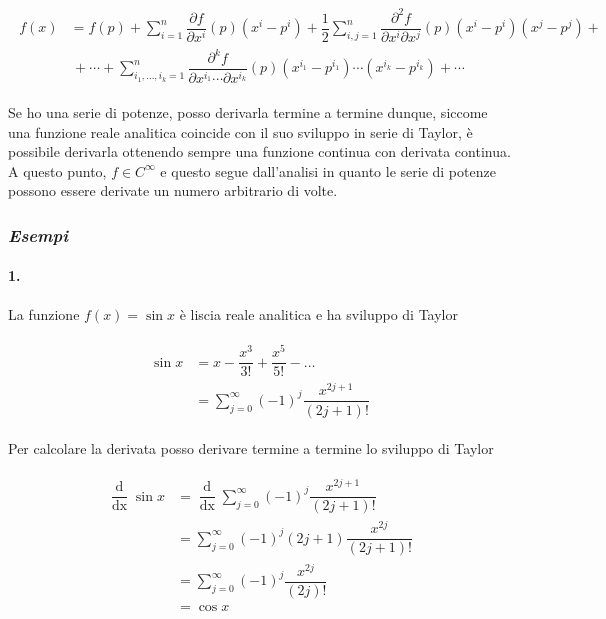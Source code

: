 \begin{align}
	\begin{split}
		f (x) &= f (p) + \sum_{i=1}^{n} \dfrac{\partial f}{\partial x^{i}} (p) (x^{i} - p^{i}) + \dfrac{1}{2} \sum_{i,j=1}^{n} \dfrac{\partial^{2} f}{\partial x^{i} \partial x^{j}} (p) (x^{i} - p^{i}) (x^{j} - p^{j}) +\\
		& \, + \cdots + \sum_{i_{1},\dots,i_{k}=1}^{n} \dfrac{\partial^{k} f}{\partial x^{i_{1}} \cdots \partial x^{i_{k}}} (p) (x^{i_{1}} - p^{i_{1}}) \cdots (x^{i_{k}} - p^{i_{k}}) + \cdots
	\end{split}
\end{align}

Se ho una serie di potenze, posso derivarla termine a termine dunque, siccome una funzione reale analitica coincide con il suo sviluppo in serie di Taylor, è possibile derivarla ottenendo sempre una funzione continua con derivata continua. A questo punto, $ f \in C^{\infty} $ e questo segue dall'analisi in quanto le serie di potenze possono essere derivate un numero arbitrario di volte.

\subsubsection{\textit{Esempi}}

\paragraph{1.}

La funzione $ f (x) = \sin x $ è liscia reale analitica e ha sviluppo di Taylor

\begin{align}
	\begin{split}
		\sin x &= x - \dfrac{x^{3}}{3!} + \dfrac{x^{5}}{5!} - \dots\\
		&= \sum_{j=0}^{\infty} (-1)^{j} \dfrac{x^{2j+1}}{(2j+1)!}
	\end{split}
\end{align}

Per calcolare la derivata posso derivare termine a termine lo sviluppo di Taylor

\begin{align}
	\begin{split}
		\dfrac{\operatorname{d}}{\operatorname{dx}} \sin x &= \dfrac{\operatorname{d}}{\operatorname{dx}} \sum_{j=0}^{\infty} (-1)^{j} \dfrac{x^{2j+1}}{(2j+1)!}\\
		&= \sum_{j=0}^{\infty} (-1)^{j} (2j+1) \dfrac{x^{2j}}{(2j+1)!}\\
		&= \sum_{j=0}^{\infty} (-1)^{j} \dfrac{x^{2j}}{(2j)!}\\
		&= \cos x
	\end{split}
\end{align}

